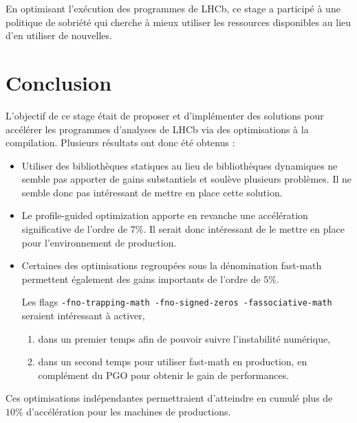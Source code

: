 \documentclass[a4paper,11pt]{report}
\begin{document}
En optimisant l'exécution des programmes de LHCb, ce stage a participé à une politique de sobriété qui cherche à mieux utiliser les ressources disponibles au lieu d'en utiliser de nouvelles.


\chapter*{Conclusion}
L'objectif de ce stage était de proposer et d'implémenter des solutions pour accélérer les programmes d'analyses de LHCb via des optimisations à la compilation.
Plusieurs résultats ont donc été obtenus :
\begin{itemize}
    \item Utiliser des bibliothèques statiques au lieu de bibliothèques dynamiques ne semble pas apporter de gains substantiels et soulève plusieurs problèmes.
          Il ne semble donc pas intéressant de mettre en place cette solution.
    \item Le profile-guided optimization apporte en revanche une accélération significative de l'ordre de $7\%$.
          Il serait donc intéressant de le mettre en place pour l'environnement de production.
    \item Certaines des optimisations regroupées sous la dénomination fast-math permettent également des gains importants de l'ordre de $5\%$.

          Les flags \verb'-fno-trapping-math -fno-signed-zeros -fassociative-math' seraient intéressant à activer,
          \begin{enumerate}
              \item dans un premier temps afin de pouvoir suivre l'instabilité numérique,
              \item dans un second temps pour utiliser fast-math en production, en complément du PGO pour obtenir le gain de performances.
          \end{enumerate}
\end{itemize}

Ces optimisations indépendantes permettraient d'atteindre en cumulé plus de $10\%$ d'accélération pour les machines de productions.


\printbibliography
{}
\end{document}

